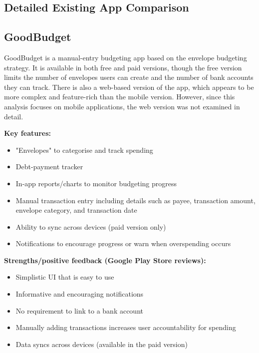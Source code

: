 \documentclass{l4proj}
\begin{document}
\begin{appendices}

\chapter{Detailed Existing App Comparison}
\label{app:app-comparison}
\section{GoodBudget}

GoodBudget is a manual-entry budgeting app based on the envelope budgeting strategy. It is available in both free and paid versions, though the free version limits the number of envelopes users can create and the number of bank accounts they can track. There is also a web-based version of the app, which appears to be more complex and feature-rich than the mobile version. However, since this analysis focuses on mobile applications, the web version was not examined in detail.

\vspace{0.5em}
\textbf{Key features:}
\begin{itemize}
    \item "Envelopes" to categorise and track spending
    \item Debt-payment tracker
    \item In-app reports/charts to monitor budgeting progress
    \item Manual transaction entry including details such as payee, transaction amount, envelope category, and transaction date
    \item Ability to sync across devices (paid version only)
    \item Notifications to encourage progress or warn when overspending occurs
\end{itemize}

\vspace{0.5em}
\textbf{Strengths/positive feedback (Google Play Store reviews):}
\begin{itemize}
    \item Simplistic UI that is easy to use
    \item Informative and encouraging notifications
    \item No requirement to link to a bank account
    \item Manually adding transactions increases user accountability for spending
    \item Data syncs across devices (available in the paid version)
\end{itemize}


\end{appendices}
\end{document}
